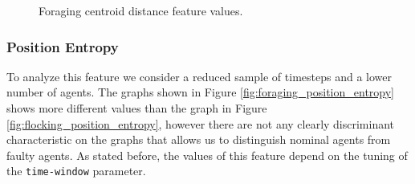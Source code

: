 \documentclass[../../Thesis.tex]{subfiles}
\begin{document}
\begin{figure}
{					}
					\caption{Foraging centroid distance feature values.}
					\label{fig:foraging_cumulative_centroid_distance}
				\end{figure}
				
			\subsubsection{Position Entropy}
				To analyze this feature we consider a reduced sample of timesteps and a lower number of agents. The graphs shown in Figure \ref{fig:foraging_position_entropy} shows more different values than the graph in Figure \ref{fig:flocking_position_entropy}, however there are not any clearly discriminant characteristic on the graphs that allows us to distinguish nominal agents from faulty agents. As stated before, the values of this feature depend on the tuning of the \verb|time-window| parameter. 
\end{document}
